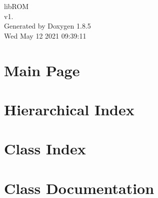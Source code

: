 \documentclass[twoside]{book}
\newcommand{\clearemptydoublepage}{%
  \newpage{\pagestyle{empty}\cleardoublepage}%
}
\begin{document}
\hypersetup{pageanchor=false}
\begin{titlepage}
\vspace*{7cm}
\begin{center}%
{\Large lib\-R\-O\-M \\[1ex]\large v1. }\\
\vspace*{1cm}
{\large Generated by Doxygen 1.8.5}\\
\vspace*{0.5cm}
{\small Wed May 12 2021 09:39:11}\\
\end{center}
\end{titlepage}
\clearemptydoublepage
\tableofcontents
\clearemptydoublepage
{}
\hypersetup{pageanchor=true}

\chapter{Main Page}
\label{index}\hypertarget{index}{}
\chapter{Hierarchical Index}

\chapter{Class Index}

\chapter{Class Documentation}

















\newpage
{}
{}
\printindex
\end{document}
